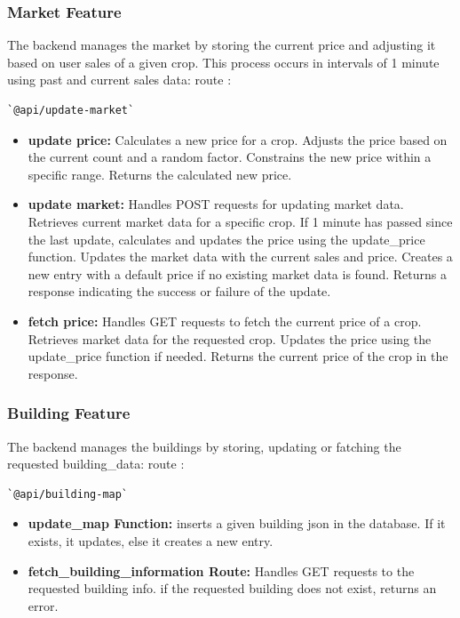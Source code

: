 \documentclass[12pt]{article}
\begin{document}
\subsubsection{Market Feature}
The backend manages the market by storing the current price and adjusting it based on user sales of a given crop. This process occurs in intervals of 1 minute using past and current sales data:
route : \begin{verbatim}`@api/update-market`\end{verbatim}
\begin{itemize}
    \item \textbf{update price:} Calculates a new price for a crop. Adjusts the price based on the current count and a random factor. Constrains the new price within a specific range. Returns the calculated new price.
    \item \textbf{update market:} Handles POST requests for updating market data. Retrieves current market data for a specific crop. If 1 minute has passed since the last update, calculates and updates the price using the update\_price function. Updates the market data with the current sales and price. Creates a new entry with a default price if no existing market data is found. Returns a response indicating the success or failure of the update.
    \item \textbf{fetch price:} Handles GET requests to fetch the current price of a crop. Retrieves market data for the requested crop. Updates the price using the update\_price function if needed. Returns the current price of the crop in the response.
\end{itemize}

\subsubsection{Building Feature}
The backend manages the buildings by storing, updating or fatching the requested building\_data:
route : \begin{verbatim}`@api/building-map`\end{verbatim}
\begin{itemize}
    \item \textbf{update\_map Function:} inserts a given building json in the database. If it exists, it updates, else it creates a new entry.
    \item \textbf{fetch\_building\_information Route:} Handles GET requests to the requested building info. if the requested building does not exist, returns an error.
\end{itemize}
\end{document}

